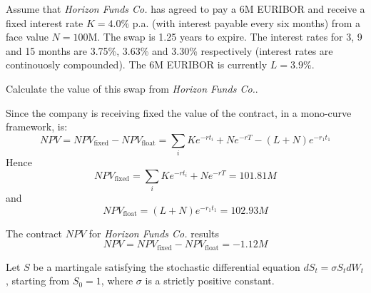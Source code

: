 \documentclass[12pt,a4paper]{exam}
\begin{document}
\begin{questions}

Assume that \emph{Horizon Funds Co.} has agreed to pay a 6M EURIBOR and receive a fixed interest rate $K=4.0\%$ p.a. (with interest payable every six months) from a face value $N=100$M. The swap is 1.25 years to expire. The interest rates for 3, 9 and 15 months are 3.75\%, 3.63\% and 3.30\% respectively (interest rates are continouosly compounded). The 6M EURIBOR is currently $L=3.9\%$.

Calculate the value of this swap from \emph{Horizon Funds Co.}.

\begin{solution}
Since the company is receiving fixed the value of the contract, in a mono-curve framework, is:
\begin{equation*}
NPV = NPV_{\text{fixed}} - NPV_{\text{float}} = \sum_i Ke^{-rt_i} + N e^{-rT} - (L + N) e^{-r_1 t_1}
\end{equation*}
Hence
\begin{equation*}
NPV_{\text{fixed}} = \sum_i Ke^{-rt_i} + N e^{-rT} = 101.81 M
\end{equation*}
and
\begin{equation*}
NPV_{\text{float}} = (L + N) e^{-r_1 t_1} = 102.93 M
\end{equation*}

The contract $NPV$ for \emph{Horizon Funds Co.} results
\begin{equation*}
NPV = NPV_{\text{fixed}} - NPV_{\text{float}} = -1.12 M
\end{equation*}
\end{solution}


Let $S$ be a martingale satisfying the stochastic differential equation $dS_t = \sigma S_t dW_t$, starting from $S_0 = 1$,
where $\sigma$ is a strictly positive constant.
\end{questions}
\end{document}

